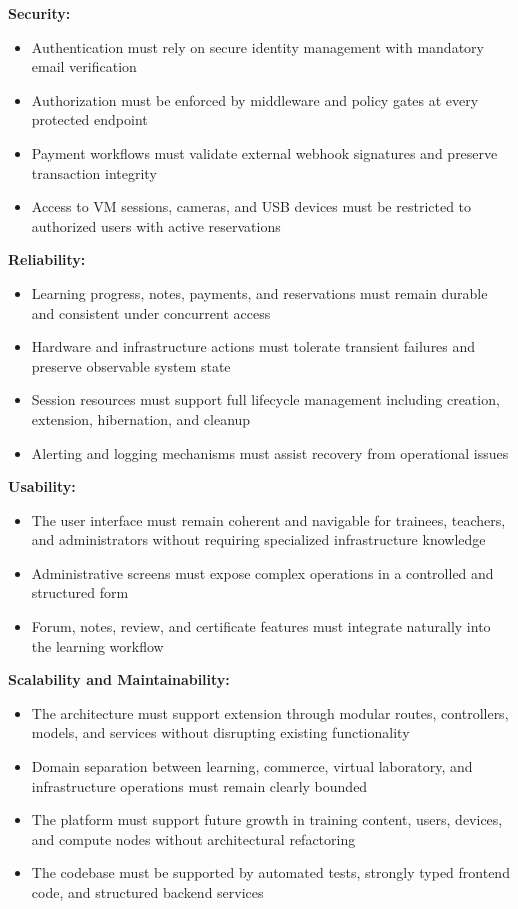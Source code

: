 \textbf{Security:}
\begin{itemize}[label=-]
    \item Authentication must rely on secure identity management with mandatory email
          verification
    \item Authorization must be enforced by middleware and policy gates at every
          protected endpoint
    \item Payment workflows must validate external webhook signatures and preserve
          transaction integrity
    \item Access to VM sessions, cameras, and USB devices must be restricted to
          authorized users with active reservations
\end{itemize}

\textbf{Reliability:}
\begin{itemize}[label=-]
    \item Learning progress, notes, payments, and reservations must remain durable and
          consistent under concurrent access
    \item Hardware and infrastructure actions must tolerate transient failures and
          preserve observable system state
    \item Session resources must support full lifecycle management including creation,
          extension, hibernation, and cleanup
    \item Alerting and logging mechanisms must assist recovery from operational issues
\end{itemize}

\textbf{Usability:}
\begin{itemize}[label=-]
    \item The user interface must remain coherent and navigable for trainees, teachers,
          and administrators without requiring specialized infrastructure knowledge
    \item Administrative screens must expose complex operations in a controlled and
          structured form
    \item Forum, notes, review, and certificate features must integrate naturally into
          the learning workflow
\end{itemize}

\textbf{Scalability and Maintainability:}
\begin{itemize}[label=-]
    \item The architecture must support extension through modular routes, controllers,
          models, and services without disrupting existing functionality
    \item Domain separation between learning, commerce, virtual laboratory, and
          infrastructure operations must remain clearly bounded
    \item The platform must support future growth in training content, users, devices,
          and compute nodes without architectural refactoring
    \item The codebase must be supported by automated tests, strongly typed frontend
          code, and structured backend services
\end{itemize}

